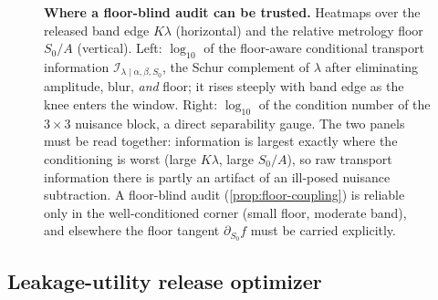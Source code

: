 \documentclass[11pt]{article}
\newcommand{\calI}{\mathcal I}
\begin{document}
\begin{figure}[htbp]
\centering
\def\couplingcols{7}
\centering
{}

\caption{\textbf{Where a floor-blind audit can be trusted.} Heatmaps over the released band edge \(K\lambda\) (horizontal) and the relative metrology floor \(S_0/A\) (vertical). Left: \(\log_{10}\) of the floor-aware conditional transport information \(\calI_{\lambda\mid\alpha,\beta,S_0}\), the Schur complement of \(\lambda\) after eliminating amplitude, blur, \emph{and} floor; it rises steeply with band edge as the knee enters the window. Right: \(\log_{10}\) of the condition number of the \(3\times3\) nuisance block, a direct separability gauge. The two panels must be read together: information is largest exactly where the conditioning is worst (large \(K\lambda\), large \(S_0/A\)), so raw transport information there is partly an artifact of an ill-posed nuisance subtraction. A floor-blind audit (\cref{prop:floor-coupling}) is reliable only in the well-conditioned corner (small floor, moderate band), and elsewhere the floor tangent \(\partial_{S_0}f\) must be carried explicitly.}
\label{fig:coupling}
\end{figure}

\subsection{Leakage-utility release optimizer}
\end{document}
